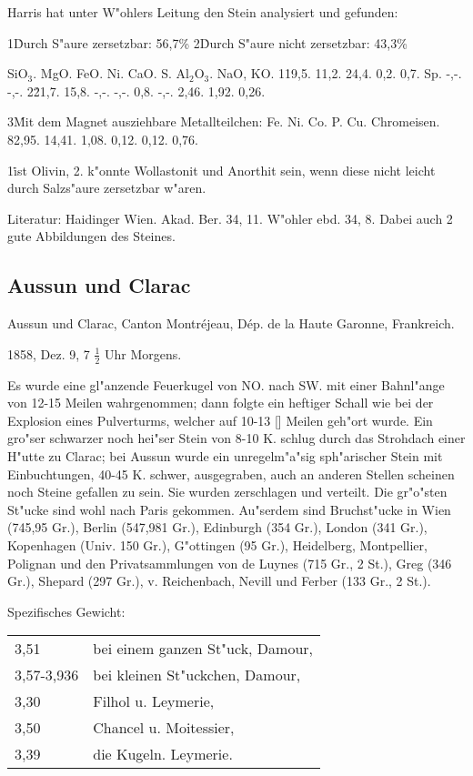\documentclass[a4paper, 11pt, oneside]{article}
\begin{document}
Harris hat unter W"ohlers Leitung den Stein analysiert und gefunden:

1\. Durch S"aure zersetzbar: 56,7\%  
2\. Durch S"aure nicht zersetzbar: 43,3\%

SiO$_{3}$. MgO. FeO. Ni. CaO. S. Al$_{2}$O$_{3}$. NaO, KO.  
1\. 19,5. 11,2. 24,4. 0,2. 0,7. Sp. -,-. -,-.  
2\. 21,7. 15,8. -,-. -,-. 0,8. -,-. 2,46. 1,92. 0,26.

3\. Mit dem Magnet ausziehbare Metallteilchen:  
Fe. Ni. Co. P. Cu. Chromeisen.  
82,95. 14,41. 1,08. 0,12. 0,12. 0,76.

1\. ist Olivin, 2. k"onnte Wollastonit und Anorthit sein, wenn diese nicht leicht durch Salzs"aure zersetzbar w"aren.

Literatur: Haidinger Wien. Akad. Ber. 34, 11. W"ohler ebd. 34, 8. Dabei auch 2 gute Abbildungen des Steines.

\subsection{Aussun und Clarac}

Aussun und Clarac, Canton Montréjeau, Dép. de la Haute Garonne, Frankreich.

1858, Dez. 9, 7 $\frac{1}{2}$ Uhr Morgens.

Es wurde eine gl"anzende Feuerkugel von NO. nach SW. mit einer Bahnl"ange von 12-15 Meilen wahrgenommen; dann folgte ein heftiger Schall wie bei der Explosion eines Pulverturms, welcher auf 10-13 [] Meilen geh"ort wurde. Ein gro"ser schwarzer noch hei"ser Stein von 8-10 K. schlug durch das Strohdach einer H"utte zu Clarac; bei Aussun wurde ein unregelm"a"sig sph"arischer Stein mit Einbuchtungen, 40-45 K. schwer, ausgegraben, auch an anderen Stellen scheinen noch Steine gefallen zu sein. Sie wurden zerschlagen und verteilt. Die gr"o"sten St"ucke sind wohl nach Paris gekommen. Au"serdem sind Bruchst"ucke in Wien (745,95 Gr.), Berlin (547,981 Gr.), Edinburgh (354 Gr.), London (341 Gr.), Kopenhagen (Univ. 150 Gr.), G"ottingen (95 Gr.), Heidelberg, Montpellier, Polignan und den Privatsammlungen von de Luynes (715 Gr., 2 St.), Greg (346 Gr.), Shepard (297 Gr.), v. Reichenbach, Nevill und Ferber (133 Gr., 2 St.).

Spezifisches Gewicht:  
\begin{table}[!ht]
    \centering
    \begin{tabular}{l l}
        3,51 & bei einem ganzen St"uck, Damour,\\
        3,57-3,936 & bei kleinen St"uckchen, Damour,\\
        3,30 & Filhol u. Leymerie,\\
        3,50 & Chancel u. Moitessier,\\
        3,39 & die Kugeln. Leymerie.
    \end{tabular}
\end{table}
\end{document}
